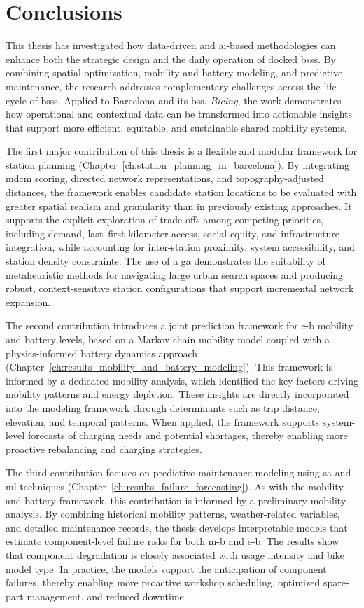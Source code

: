 \section{Conclusions}

This thesis has investigated how data-driven and \ac{ai}-based methodologies can enhance both the strategic design and the daily operation of docked \acp{bss}. By combining spatial optimization, mobility and battery modeling, and predictive maintenance, the research addresses complementary challenges across the life cycle of \acp{bss}. Applied to Barcelona and its \ac{bss}, \textit{Bicing}, the work demonstrates how operational and contextual data can be transformed into actionable insights that support more efficient, equitable, and sustainable shared mobility systems.

The first major contribution of this thesis is a flexible and modular framework for station planning (Chapter~\ref{ch:station_planning_in_barcelona}). By integrating \ac{mdcm} scoring, directed network representations, and topography-adjusted distances, the framework enables candidate station locations to be evaluated with greater spatial realism and granularity than in previously existing approaches. It supports the explicit exploration of trade-offs among competing priorities, including demand, last–first-kilometer access, social equity, and infrastructure integration, while accounting for inter-station proximity, system accessibility, and station density constraints. The use of a \ac{ga} demonstrates the suitability of metaheuristic methods for navigating large urban search spaces and producing robust, context-sensitive station configurations that support incremental network expansion.

The second contribution introduces a joint prediction framework for \ac{e-b} mobility and battery levels, based on a Markov chain mobility model coupled with a physics-informed battery dynamics approach (Chapter~\ref{ch:results_mobility_and_battery_modeling}). This framework is informed by a dedicated mobility analysis, which identified the key factors driving mobility patterns and energy depletion. These insights are directly incorporated into the modeling framework through determinants such as trip distance, elevation, and temporal patterns. When applied, the framework supports system-level forecasts of charging needs and potential shortages, thereby enabling more proactive rebalancing and charging strategies.

The third contribution focuses on predictive maintenance modeling using \ac{sa} and \ac{ml} techniques (Chapter~\ref{ch:results_failure_forecasting}). As with the mobility and battery framework, this contribution is informed by a preliminary mobility analysis. By combining historical mobility patterns, weather-related variables, and detailed maintenance records, the thesis develops interpretable models that estimate component-level failure risks for both \ac{m-b} and \ac{e-b}. The results show that component degradation is closely associated with usage intensity and bike model type. In practice, the models support the anticipation of component failures, thereby enabling more proactive workshop scheduling, optimized spare-part management, and reduced downtime.

